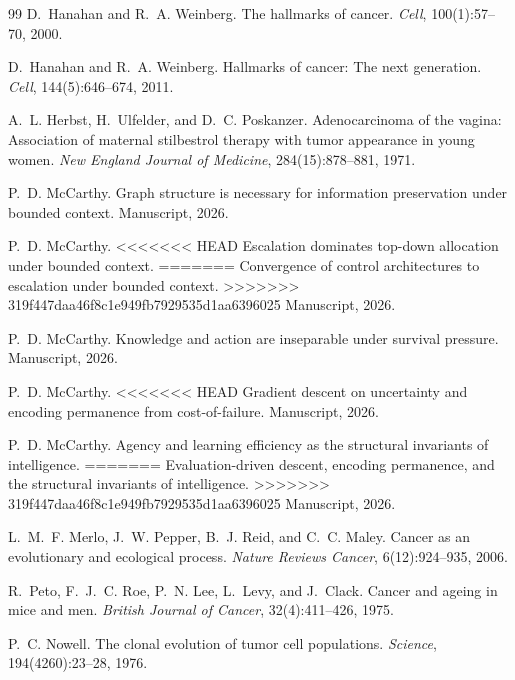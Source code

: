 \documentclass[11pt]{article}
\theoremstyle{definition}
\theoremstyle{remark}
\begin{document}
\begin{thebibliography}{99}
D.~Hanahan and R.~A. Weinberg.
\newblock The hallmarks of cancer.
\newblock \emph{Cell}, 100(1):57--70, 2000.

D.~Hanahan and R.~A. Weinberg.
\newblock Hallmarks of cancer: The next generation.
\newblock \emph{Cell}, 144(5):646--674, 2011.

A.~L. Herbst, H.~Ulfelder, and D.~C. Poskanzer.
\newblock Adenocarcinoma of the vagina: Association of maternal stilbestrol
  therapy with tumor appearance in young women.
\newblock \emph{New England Journal of Medicine}, 284(15):878--881, 1971.

P.~D. McCarthy.
\newblock Graph structure is necessary for information preservation under
  bounded context.
\newblock Manuscript, 2026.

P.~D. McCarthy.
<<<<<<< HEAD
\newblock Escalation dominates top-down allocation under bounded context.
=======
\newblock Convergence of control architectures to escalation under bounded context.
>>>>>>> 319f447daa46f8c1e949fb7929535d1aa6396025
\newblock Manuscript, 2026.

P.~D. McCarthy.
\newblock Knowledge and action are inseparable under survival pressure.
\newblock Manuscript, 2026.

P.~D. McCarthy.
<<<<<<< HEAD
\newblock Gradient descent on uncertainty and encoding permanence from
  cost-of-failure.
\newblock Manuscript, 2026.

P.~D. McCarthy.
\newblock Agency and learning efficiency as the structural invariants of
  intelligence.
=======
\newblock Evaluation-driven descent, encoding permanence, and the structural
  invariants of intelligence.
>>>>>>> 319f447daa46f8c1e949fb7929535d1aa6396025
\newblock Manuscript, 2026.

L.~M.~F. Merlo, J.~W. Pepper, B.~J. Reid, and C.~C. Maley.
\newblock Cancer as an evolutionary and ecological process.
\newblock \emph{Nature Reviews Cancer}, 6(12):924--935, 2006.

R.~Peto, F.~J.~C. Roe, P.~N. Lee, L.~Levy, and J.~Clack.
\newblock Cancer and ageing in mice and men.
\newblock \emph{British Journal of Cancer}, 32(4):411--426, 1975.

P.~C. Nowell.
\newblock The clonal evolution of tumor cell populations.
\newblock \emph{Science}, 194(4260):23--28, 1976.


\end{thebibliography}
\end{document}
